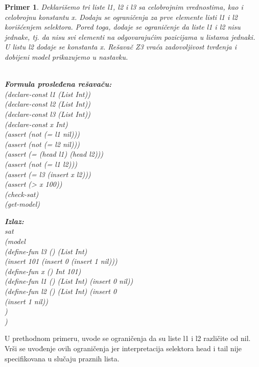 \documentclass[12pt,oneside]{memoir}
\newcommand\tab[1][0.5cm]{\hspace*{#1}}
\newtheorem{primer}{Primer}
\begin{document}
\begin{primer} Deklarišemo tri liste l1, l2 i l3 sa celobrojnim vrednostima, kao i celobrojnu konstantu x. Dodaju se ograničenja za prve elemente listi l1 i l2 korišćenjem selektora. Pored toga, dodaje se ograničenje da liste l1 i l2 nisu jednake, tj. da nisu svi elementi na odgovarajućim pozicijama u listama jednaki. U listu l2 dodaje se konstanta x. Rešavač Z3 vraća zadovoljivost tvrđenja i dobijeni model prikazujemo u nastavku.
\\ \\
\begin{minipage}[b]{0.42\textwidth}
\textbf{Formula prosleđena rešavaču:}
\\(declare-const l1 (List Int))
\\(declare-const l2 (List Int))
\\(declare-const l3 (List Int))
\\(declare-const x Int)
\\(assert (not (= l1 nil)))
\\(assert (not (= l2 nil)))
\\(assert (= (head l1) (head l2)))
\\(assert (not (= l1 l2)))
\\(assert (= l3 (insert x l2)))
\\(assert (> x 100))
\\(check-sat)
\\(get-model)
\end{minipage}
\hspace{0.9cm}
\begin{minipage}[t]{0.55\textwidth}
\vspace{-7.84cm}
\textbf{Izlaz:}
\\sat 
\\(model 
\\\tab(define-fun l3 () (List Int) 
\\\tab(insert 101 (insert 0 (insert 1 nil)))
\\\tab(define-fun x () Int 101) 
\\\tab(define-fun l1 () (List Int) (insert 0 nil)) 
\\\tab(define-fun l2 () (List Int) (insert 0 
\\\tab\tab(insert 1 nil))
\\\tab)
\\) 
\end{minipage}


\end{primer}

U prethodnom primeru, uvode se ograničenja da su liste l1 i l2 različite od nil. Vrši se uvođenje ovih ograničenja jer interpretacija selektora head i tail 
nije specifikovana u slučaju praznih lista.
\end{document}
